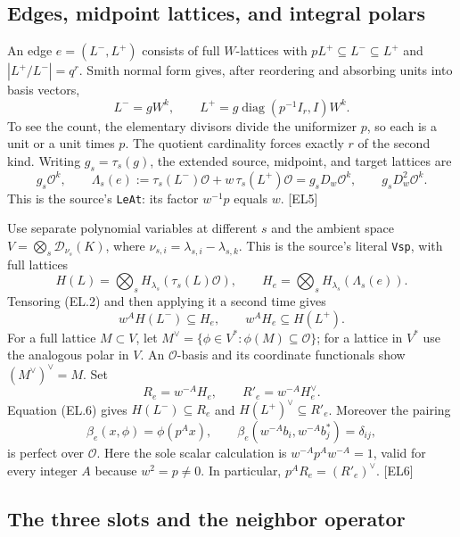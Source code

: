 \documentclass[11pt,a4paper]{article}
\numberwithin{equation}{section}
\theoremstyle{remark}\newtheorem{remark}[theorem]{Remark}
\begin{document}
\subsection{Edges, midpoint lattices, and integral polars}

An edge $e=(L^-,L^+)$ consists of full $W$-lattices with
$pL^+\subseteq L^-\subseteq L^+$ and $|L^+/L^-|=q^r$.
Smith normal form gives, after reordering and absorbing units into basis vectors,
\[
 L^-=gW^k,\qquad
 L^+=g\operatorname{diag}(p^{-1}I_r,I)W^k.
 \tag{EL.4}
\]
To see the count, the elementary divisors divide the uniformizer $p$, so each is a unit or a unit times $p$. The quotient cardinality forces exactly $r$ of the second kind.
Writing $g_s=\tau_s(g)$, the extended source, midpoint, and target lattices are
\[
 g_s\mathcal O^k,\qquad
 \Lambda_s(e):=\tau_s(L^-)\mathcal O+w\,\tau_s(L^+)\mathcal O
      =g_sD_w\mathcal O^k,\qquad
 g_sD_w^2\mathcal O^k .
 \tag{EL.5}
\]
This is the source's \texttt{LeAt}: its factor $w^{-1}p$ equals $w$.
\textsf{[EL5]}

Use separate polynomial variables at different $s$ and the ambient space
$V=\bigotimes_s\mathcal D_{\nu_s}(K)$, where $\nu_{s,i}=\lambda_{s,i}-\lambda_{s,k}$.
This is the source's literal \texttt{Vsp}, with full lattices
\[
 H(L)=\bigotimes_s H_{\lambda_s}(\tau_s(L)\mathcal O),
 \qquad
 H_e=\bigotimes_s H_{\lambda_s}(\Lambda_s(e)).
\]
Tensoring (EL.2) and then applying it a second time gives
\[
 w^A H(L^-)\subseteq H_e,\qquad
 w^A H_e\subseteq H(L^+).
 \tag{EL.6}
\]
For a full lattice $M\subset V$, let
$M^\vee=\{\phi\in V^*:\phi(M)\subseteq\mathcal O\}$; for a lattice in $V^*$ use the analogous polar in $V$.
An $\mathcal O$-basis and its coordinate functionals show
$(M^\vee)^\vee=M$.
Set
\[
 R_e=w^{-A}H_e,\qquad R'_e=w^{-A}H_e^\vee.
\]
Equation (EL.6) gives
$H(L^-)\subseteq R_e$ and $H(L^+)^\vee\subseteq R'_e$.
Moreover the pairing
\[
 \beta_e(x,\phi)=\phi(p^A x),\qquad
 \beta_e(w^{-A}b_i,w^{-A}b_j^*)=\delta_{ij},
 \tag{EL.7}
\]
is perfect over $\mathcal O$. Here the sole scalar calculation is
$w^{-A}p^Aw^{-A}=1$, valid for every integer $A$ because $w^2=p\ne0$.
In particular,
$p^A R_e=(R'_e)^\vee$.
\textsf{[EL6]}

\subsection{The three slots and the neighbor operator}
\end{document}
